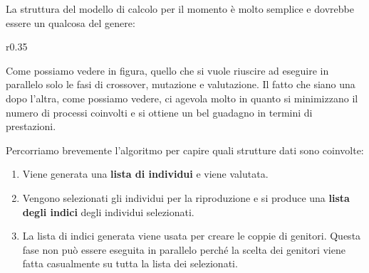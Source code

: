 La struttura del modello di calcolo per il momento è molto semplice e dovrebbe
essere un qualcosa del genere:

\begin{wrapfigure}{r}{0.35\textwidth}
	
\end{wrapfigure}

Come possiamo vedere in figura, quello che si vuole riuscire ad eseguire in
parallelo solo le fasi di crossover, mutazione e valutazione. Il fatto che
siano una dopo l'altra, come possiamo vedere, ci agevola molto in quanto si
minimizzano il numero di processi coinvolti e si ottiene un bel guadagno in
termini di prestazioni.

Percorriamo brevemente l'algoritmo per capire quali strutture dati sono
coinvolte:

\begin{enumerate}
	\item Viene generata una \textbf{lista di individui} e viene valutata.
	\item Vengono selezionati gli individui per la riproduzione e si produce
	      una \textbf{lista degli indici} degli individui selezionati.
	\item La lista di indici generata viene usata per creare le coppie di
	      genitori. Questa fase non può essere eseguita in parallelo perché
	      la scelta dei genitori viene fatta casualmente su tutta la lista
	      dei selezionati.
\end{enumerate}